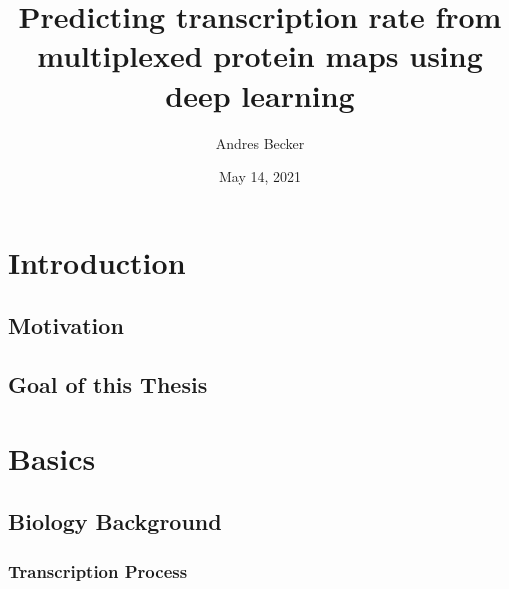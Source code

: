 \documentclass[biblatexBackend=bibtex]{tumthesis}
\author{Andres Becker}
\title{Predicting transcription rate from multiplexed protein maps using deep learning}
\institute{Chair of Mathematical Modeling of Biological Systems}
\date{May 14, 2021} %
\begin{document}
\pagestyle{empty}
\frontmatter%
\maketitlepage%





\tableofcontents%

\mainmatter%
\pagestyle{headings}

\chapter{Introduction}
\label{ch:introduction}


\section{Motivation}
\label{sec:intro:motivation}


\section{Goal of this Thesis}
\label{sec:intro:goals}


\chapter{Basics}
\label{ch:basics}


\section{Biology Background}
\label{sec:basics:bio_back}

\subsection{Transcription Process}
\label{sec:basics:transcription_process}

\end{document}
